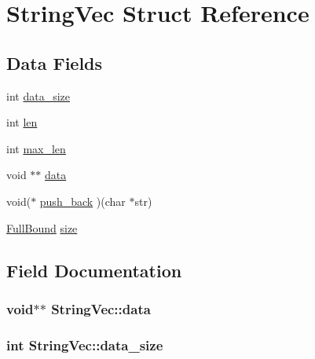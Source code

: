 \hypertarget{struct_string_vec}{}\section{String\+Vec Struct Reference}
\label{struct_string_vec}
\subsection*{Data Fields}
\begin{DoxyCompactItemize}
\item 
int \hyperlink{struct_string_vec_a4833997da46043501e6fbfafaa01dabf}{data\+\_\+size}
\item 
int \hyperlink{struct_string_vec_a7c24f16a046318d0be2902e0b40f07e4}{len}
\item 
int \hyperlink{struct_string_vec_a78df5c5f47656d385e2f6d1f2e9ed62b}{max\+\_\+len}
\item 
void $\ast$$\ast$ \hyperlink{struct_string_vec_a4ee18d189b50df8546029601ef1b76da}{data}
\item 
void($\ast$ \hyperlink{struct_string_vec_a8034d98a50a5e9d365f40cf93a80f625}{push\+\_\+back} )(char $\ast$str)
\item 
\hyperlink{bind__defs_8h_a7c87cc0eb01b046c5adc0fb1d6fcd62c}{Full\+Bound} \hyperlink{struct_string_vec_ae4ae32f5a45935a1d362357d264b6c2c}{size}
\end{DoxyCompactItemize}


\subsection{Field Documentation}
\subsubsection[{\texorpdfstring{data}{data}}]{\setlength{\rightskip}{0pt plus 5cm}void$\ast$$\ast$ String\+Vec\+::data}\hypertarget{struct_string_vec_a4ee18d189b50df8546029601ef1b76da}{}\label{struct_string_vec_a4ee18d189b50df8546029601ef1b76da}
\subsubsection[{\texorpdfstring{data\+\_\+size}{data_size}}]{\setlength{\rightskip}{0pt plus 5cm}int String\+Vec\+::data\+\_\+size}\hypertarget{struct_string_vec_a4833997da46043501e6fbfafaa01dabf}{}\label{struct_string_vec_a4833997da46043501e6fbfafaa01dabf}
